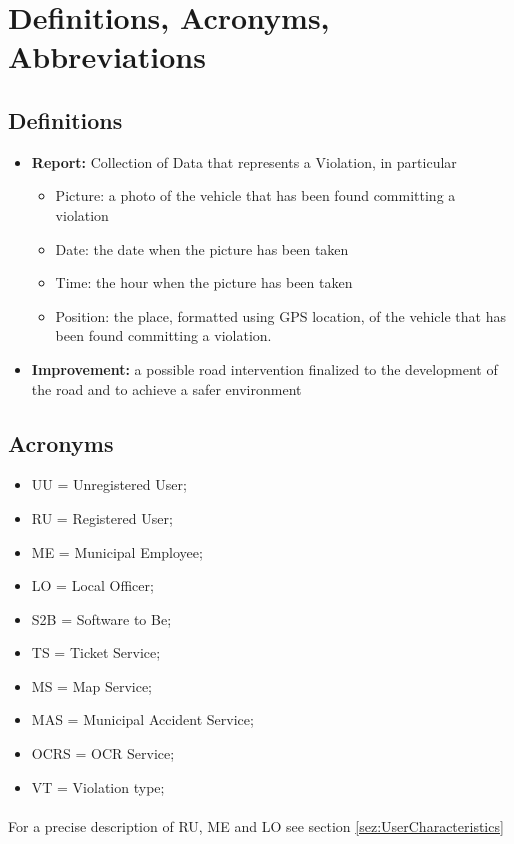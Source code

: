 		\section{Definitions, Acronyms, Abbreviations}
			\subsection{Definitions}
				\begin{itemize}
					\item \textbf{Report:} Collection of Data that represents a Violation, in particular
						\begin{itemize}
							\item Picture: a photo of the vehicle that has been found committing a violation
							\item Date: the date when the picture has been taken
							\item Time: the hour when the picture has been taken
							\item Position: the place, formatted using GPS location, of the vehicle that has been found committing a violation.
						\end{itemize}
					\item \textbf{Improvement:} a possible road intervention finalized to the development of the road and to achieve a safer environment
				\end{itemize}
			\subsection{Acronyms}
				\begin{itemize}
					\item UU = Unregistered User;
					\item RU = Registered User;
					\item ME = Municipal Employee;
					\item LO = Local Officer;
					\item S2B = Software to Be;
					\item TS = Ticket Service;
					\item MS = Map Service;
					\item MAS = Municipal Accident Service;
					\item OCRS = OCR Service;
					\item VT = Violation type;
				\end{itemize}
				\paragraph{}
					For a precise description of RU, ME and LO see section \ref{sez:UserCharacteristics}
					
